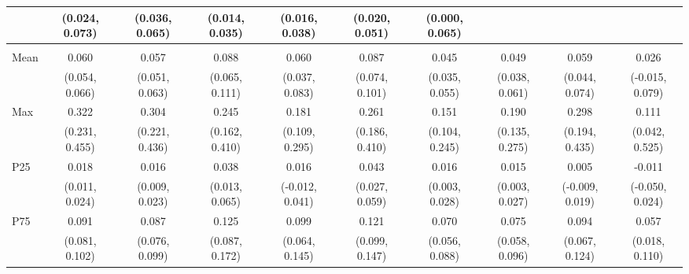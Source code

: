 {\begin{tabular}{l|c|c|c|c|c|c|c|c|c}
& {\scriptsize (0.024, 0.073)}
& {\scriptsize (0.036, 0.065)}
& {\scriptsize (0.014, 0.035)}
& {\scriptsize (0.016, 0.038)}
& {\scriptsize (0.020, 0.051)}
& {\scriptsize (0.000, 0.065)}
\\ [0.1cm]
\hline
\noalign{\smallskip}
\multicolumn{10}{l}{\textbf{Effect with Leads and Lags}} \\
\noalign{\smallskip}
\hline
Mean
& 0.060 & 0.057 & 0.088 & 0.060 & 0.087 & 0.045 & 0.049 & 0.059 & 0.026 \\
& {\scriptsize (0.054, 0.066)}
& {\scriptsize (0.051, 0.063)}
& {\scriptsize (0.065, 0.111)}
& {\scriptsize (0.037, 0.083)}
& {\scriptsize (0.074, 0.101)}
& {\scriptsize (0.035, 0.055)}
& {\scriptsize (0.038, 0.061)}
& {\scriptsize (0.044, 0.074)}
& {\scriptsize (-0.015, 0.079)}
\\ [0.1cm]
\hline
Max
& 0.322 & 0.304 & 0.245 & 0.181 & 0.261 & 0.151 & 0.190 & 0.298 & 0.111 \\
& {\scriptsize (0.231, 0.455)}
& {\scriptsize (0.221, 0.436)}
& {\scriptsize (0.162, 0.410)}
& {\scriptsize (0.109, 0.295)}
& {\scriptsize (0.186, 0.410)}
& {\scriptsize (0.104, 0.245)}
& {\scriptsize (0.135, 0.275)}
& {\scriptsize (0.194, 0.435)}
& {\scriptsize (0.042, 0.525)}
\\ [0.1cm]
\hline
P25
& 0.018 & 0.016 & 0.038 & 0.016 & 0.043 & 0.016 & 0.015 & 0.005 & -0.011 \\
& {\scriptsize (0.011, 0.024)}
& {\scriptsize (0.009, 0.023)}
& {\scriptsize (0.013, 0.065)}
& {\scriptsize (-0.012, 0.041)}
& {\scriptsize (0.027, 0.059)}
& {\scriptsize (0.003, 0.028)}
& {\scriptsize (0.003, 0.027)}
& {\scriptsize (-0.009, 0.019)}
& {\scriptsize (-0.050, 0.024)}
\\ [0.1cm]
\hline
P75
& 0.091 & 0.087 & 0.125 & 0.099 & 0.121 & 0.070 & 0.075 & 0.094 & 0.057 \\
& {\scriptsize (0.081, 0.102)}
& {\scriptsize (0.076, 0.099)}
& {\scriptsize (0.087, 0.172)}
& {\scriptsize (0.064, 0.145)}
& {\scriptsize (0.099, 0.147)}
& {\scriptsize (0.056, 0.088)}
& {\scriptsize (0.058, 0.096)}
& {\scriptsize (0.067, 0.124)}
& {\scriptsize (0.018, 0.110)}
\\ [0.1cm]
\hline
\hline
\end{tabular}
}
